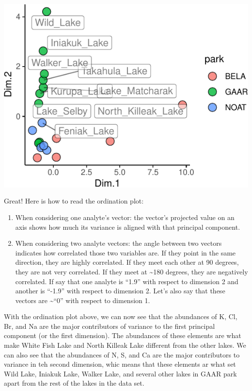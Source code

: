 \documentclass[
]{krantz}
\begin{document}
\begin{center}\includegraphics[width=0.8\linewidth]{index_files/figure-latex/unnamed-chunk-98-1} \end{center}

Great! Here is how to read the ordination plot:

\begin{enumerate}
\def\labelenumi{\arabic{enumi}.}
\item
  When considering one analyte's vector: the vector's projected value on an axis shows how much its variance is aligned with that principal component.
\item
  When considering two analyte vectors: the angle between two vectors indicates how correlated those two variables are. If they point in the same direction, they are highly correlated. If they meet each other at 90 degrees, they are not very correlated. If they meet at \textasciitilde180 degrees, they are negatively correlated. If say that one analyte is ``1.9'' with respect to dimension 2 and another is ``-1.9'' with respect to dimension 2. Let's also say that these vectors are \textasciitilde{}``0'' with respect to dimension 1.
\end{enumerate}

With the ordination plot above, we can now see that the abundances of K, Cl, Br, and Na are the major contributors of variance to the first principal component (or the first dimension). The abundances of these elements are what make White Fish Lake and North Killeak Lake different from the other lakes. We can also see that the abundances of N, S, and Ca are the major contributors to variance in teh second dimension, whic means that these elements ar what set Wild Lake, Iniakuk Lake, Walker Lake, and several other lakes in GAAR park apart from the rest of the lakes in the data set.
\end{document}

